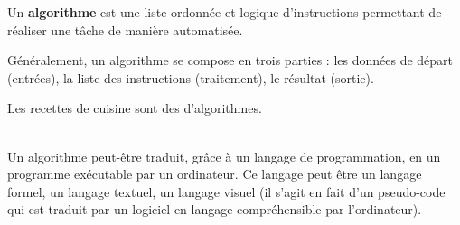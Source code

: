\begin{definition}[Algorithme]
   Un {\bf algorithme} est une liste ordonnée et logique d'instructions permettant de réaliser une tâche de manière automatisée.
\end{definition}

\bigskip

   Généralement, un algorithme se compose en trois parties : les données de départ (entrées), la liste des instructions (traitement), le résultat (sortie).

\begin{exemple*1}
   Les recettes de cuisine sont des d'algorithmes. \\ [1mm]
   {
   }
   \ \\ [-6mm]
\end{exemple*1}


\bigskip

   Un algorithme peut-être traduit, grâce à un langage de programmation, en un programme exécutable par un ordinateur. Ce langage peut être un langage formel, un langage textuel, un langage visuel (il s'agit en fait d'un pseudo-code qui est traduit par un logiciel en langage compréhensible par l'ordinateur).

\medskip

